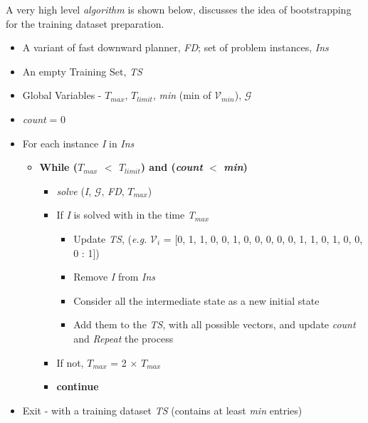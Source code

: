 \documentclass[]{article}
\begin{document}
A very high level  \emph{algorithm} is shown below, discusses the idea of bootstrapping for the training dataset preparation.
\begin{itemize}
	
	\item A variant of fast downward planner, \emph{FD}; set of problem instances, \emph{Ins}

	\item An empty Training Set, \emph{TS}

	\item Global Variables - $T_{max}$, $T_{limit}$, \emph{min} (min of $\mathcal{V}_{min}$), $\mathcal{G}$
	
	\item \emph{count} = 0

	\item For each instance \emph{I} in \emph{Ins}
	\begin{itemize}
		\item \textbf{While ($T_{max}$ $<$ $T_{limit}$) and (\emph{count} $<$ \emph{min})}
		\begin{itemize}
			\item \emph{solve} (\emph{I}, $\mathcal{G}$, \emph{FD}, $T_{max}$)
			\item If \emph{I} is solved with in the time \emph{T}$_{max}$
			\begin{itemize}
				\item Update \emph{TS}, (\emph{e.g.} $\mathcal{V}_i$ = [0, 1, 1, 0, 0, 1, 0, 0, 0, 0, 0, 1, 1, 0, 1, 0, 0, 0 : 1]) 
				\item Remove \emph{I} from \emph{Ins}
				\item Consider all the intermediate state as a new initial state
				\item Add them to the \emph{TS}, with all possible vectors, and update \emph{count} and \emph{Repeat} the process
			\end{itemize}
			\item If not, $T_{max}$ = 2 $\times$ $T_{max}$
			\item \textbf{continue}
		\end{itemize}
	\end{itemize}
\item Exit - with a training dataset \emph{TS} (contains at least \emph{min} entries)
\end{itemize}
%
\end{document}

